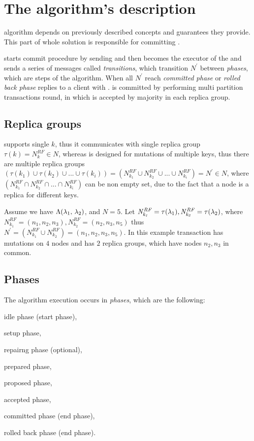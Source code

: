 
\section{The algorithm's description}
\mpt algorithm depends on previously described \paxos concepts and guarantees they provide. 
This part of whole solution is responsible for committing \transaction. 

\client starts commit procedure by sending \txCommitMessage and then  becomes the executor of the \transaction and sends a series of messages called \emph{transitions}, which transition $\mathit{N}^'$ between \emph{phases}, which are steps of the algorithm. When all $\mathit{N}^'$ reach \emph{committed phase} or \emph{rolled back phase}  replies to a client with \txCommitResonseMessage.  \transaction is committed by performing multi partition transactions \paxos round, 
in which \txState is accepted by majority in each replica group.

\subsection{Replica groups}
\label{sec:mpp:replicaGroups}
\lwt supports single $k$, thus it communicates with single replica group $\tau(k) = N^{RF}_{k} \in \mathit{N}$, whereas \mpt is designed for mutations of multiple keys, thus there are multiple replica groups 
$(\tau(k_1) \cup \tau(k_2) \cup ... \cup \tau(k_i) ) = (N^{RF}_{k_1} \cup N^{RF}_{k_2} \cup ... \cup N^{RF}_{k_i} ) = \mathit{N^'} \in \mathit{N}$, where $(N^{RF}_{k_1} \cap N^{RF}_{k_2} \cap ... \cap N^{RF}_{k_i})$ can be non empty set, due to the fact that a node is a replica for different keys.

Assume we have $\text{$\Lambda$}(\text{$\lambda_{1}$, $\lambda_{2}$})$,  and $N=5$. Let $\mathit{N^{RF}_{k_1}} = \tau(\text{$\lambda_{1}$}), \mathit{N^{RF}_{k_2}} = \tau(\text{$\lambda_{2}$})$, where $\mathit{N^{RF}_{k_1}} = (n_1,n_2,n_3), \mathit{N^{RF}_{k_2}} = (n_2,n_3,n_5)$ thus $\mathit{N}^' = (N^{RF}_{k_1} \cup N^{RF}_{k_2}) = (n_1, n_2, n_3, n_5)$.
In this example transaction has mutations on $4$ nodes and has
$2$ replica groups, which have nodes $n_2, n_3$ in common.  


\subsection{Phases}
The algorithm execution occurs in \emph{phases}, which are the following: 
\begin{enumerate*}
\item idle phase (start phase),
\item setup phase,
\item repairng phase (optional),
\item prepared phase,
\item proposed phase,
\item accepted phase,
\item committed phase (end phase),
\item rolled back phase (end phase).
\end{enumerate*}

